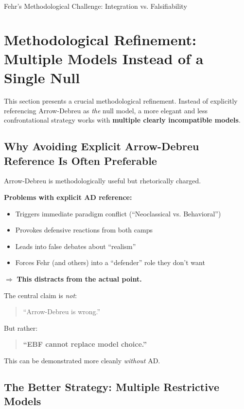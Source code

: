 \begin{chapter}{Fehr's Methodological Challenge: Integration vs. Falsifiability}
\section{Methodological Refinement: Multiple Models Instead of a Single Null}
\label{sec:multiple-models}

This section presents a crucial methodological refinement. Instead of explicitly referencing
Arrow-Debreu as \textit{the} null model, a more elegant and less confrontational strategy
works with \textbf{multiple clearly incompatible models}.

\subsection{Why Avoiding Explicit Arrow-Debreu Reference Is Often Preferable}

Arrow-Debreu is methodologically useful but rhetorically charged.

\textbf{Problems with explicit AD reference:}
\begin{itemize}[noitemsep]
    \item Triggers immediate paradigm conflict (``Neoclassical vs. Behavioral'')
    \item Provokes defensive reactions from both camps
    \item Leads into false debates about ``realism''
    \item Forces Fehr (and others) into a ``defender'' role they don't want
\end{itemize}

$\Rightarrow$ \textbf{This distracts from the actual point.}

The central claim is \textit{not}:

\begin{quote}
``Arrow-Debreu is wrong.''
\end{quote}

But rather:

\begin{quote}
\textbf{``EBF cannot replace model choice.''}
\end{quote}

This can be demonstrated more cleanly \textit{without} AD.

\subsection{The Better Strategy: Multiple Restrictive Models}


\end{chapter}

